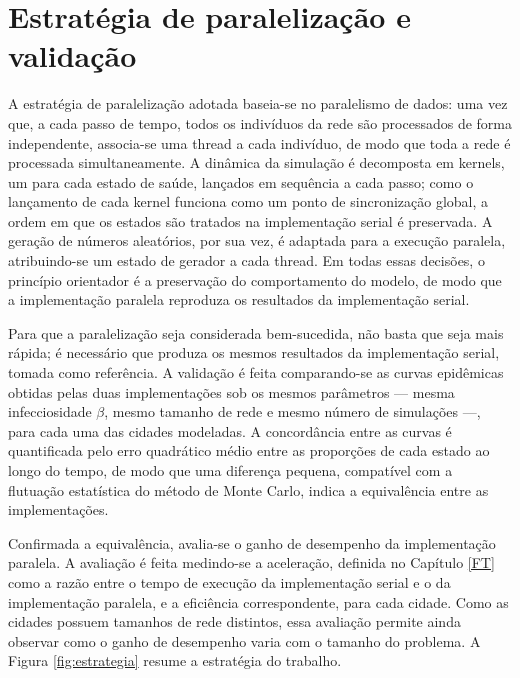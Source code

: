 \documentclass[
	12pt,				%
	openright,			%
	oneside,			%
	a4paper,			%
	english,			%
	french,				%
	spanish,			%
	brazil				%
	]{abntex2}
\begin{document}
\section{Estratégia de paralelização e validação}

A estratégia de paralelização adotada baseia-se no paralelismo de dados: uma vez que, a cada passo de tempo, todos os indivíduos da rede são processados de forma independente, associa-se uma thread a cada indivíduo, de modo que toda a rede é processada simultaneamente. A dinâmica da simulação é decomposta em kernels, um para cada estado de saúde, lançados em sequência a cada passo; como o lançamento de cada kernel funciona como um ponto de sincronização global, a ordem em que os estados são tratados na implementação serial é preservada. A geração de números aleatórios, por sua vez, é adaptada para a execução paralela, atribuindo-se um estado de gerador a cada thread. Em todas essas decisões, o princípio orientador é a preservação do comportamento do modelo, de modo que a implementação paralela reproduza os resultados da implementação serial.

Para que a paralelização seja considerada bem-sucedida, não basta que seja mais rápida; é necessário que produza os mesmos resultados da implementação serial, tomada como referência. A validação é feita comparando-se as curvas epidêmicas obtidas pelas duas implementações sob os mesmos parâmetros --- mesma infecciosidade $\beta$, mesmo tamanho de rede e mesmo número de simulações ---, para cada uma das cidades modeladas. A concordância entre as curvas é quantificada pelo erro quadrático médio entre as proporções de cada estado ao longo do tempo, de modo que uma diferença pequena, compatível com a flutuação estatística do método de Monte Carlo, indica a equivalência entre as implementações.

Confirmada a equivalência, avalia-se o ganho de desempenho da implementação paralela. A avaliação é feita medindo-se a aceleração, definida no Capítulo \ref{FT} como a razão entre o tempo de execução da implementação serial e o da implementação paralela, e a eficiência correspondente, para cada cidade. Como as cidades possuem tamanhos de rede distintos, essa avaliação permite ainda observar como o ganho de desempenho varia com o tamanho do problema. A Figura \ref{fig:estrategia} resume a estratégia do trabalho.
\end{document}
